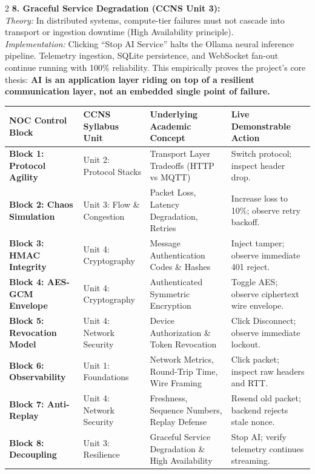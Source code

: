 \documentclass[10pt,a4paper]{article}
\begin{document}
\begin{multicols}{2}
\textbf{\textcolor{cvisgreen}{8. Graceful Service Degradation (CCNS Unit 3):}}\\
\textit{Theory:} In distributed systems, compute-tier failures must not cascade into transport or ingestion downtime (High Availability principle).\\
\textit{Implementation:} Clicking ``Stop AI Service'' halts the Ollama neural inference pipeline. Telemetry ingestion, SQLite persistence, and WebSocket fan-out continue running with 100\% reliability. This empirically proves the project's core thesis: \textbf{AI is an application layer riding on top of a resilient communication layer, not an embedded single point of failure.}

\end{multicols}

\vspace{-4pt}
\begin{table}[h!]
\centering
\scriptsize
\begin{tabularx}{\textwidth}{p{2.8cm}p{3.0cm}p{4.6cm}p{4.6cm}}
\toprule
\textbf{NOC Control Block} & \textbf{CCNS Syllabus Unit} & \textbf{Underlying Academic Concept} & \textbf{Live Demonstrable Action} \\
\midrule
\textbf{Block 1: Protocol Agility} & Unit 2: Protocol Stacks & Transport Layer Tradeoffs (HTTP vs MQTT) & Switch protocol; inspect header drop. \\
\textbf{Block 2: Chaos Simulation} & Unit 3: Flow \& Congestion & Packet Loss, Latency Degradation, Retries & Increase loss to 10\%; observe retry backoff. \\
\textbf{Block 3: HMAC Integrity} & Unit 4: Cryptography & Message Authentication Codes \& Hashes & Inject tamper; observe immediate 401 reject. \\
\textbf{Block 4: AES-GCM Envelope} & Unit 4: Cryptography & Authenticated Symmetric Encryption & Toggle AES; observe ciphertext wire envelope. \\
\textbf{Block 5: Revocation Model} & Unit 4: Network Security & Device Authorization \& Token Revocation & Click Disconnect; observe immediate lockout. \\
\textbf{Block 6: Observability} & Unit 1: Foundations & Network Metrics, Round-Trip Time, Wire Framing & Click packet; inspect raw headers and RTT. \\
\textbf{Block 7: Anti-Replay} & Unit 4: Network Security & Freshness, Sequence Numbers, Replay Defense & Resend old packet; backend rejects stale nonce. \\
\textbf{Block 8: Decoupling} & Unit 3: Resilience & Graceful Service Degradation \& High Availability & Stop AI; verify telemetry continues streaming. \\
\bottomrule
\end{tabularx}
\end{table}
\end{document}
